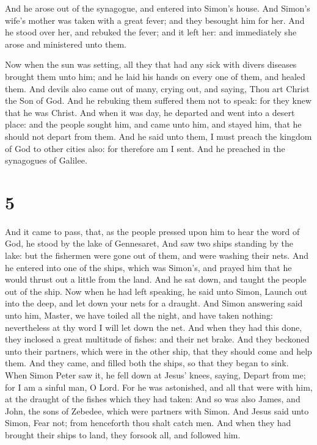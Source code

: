  And he arose out of the synagogue, and entered into
Simon's house. And Simon's wife's mother was taken with a great fever;
and they besought him for her.  And he stood over her,
and rebuked the fever; and it left her: and immediately she arose and
ministered unto them.

 Now when the sun was setting, all they that had any sick
with divers diseases brought them unto him; and he laid his hands on
every one of them, and healed them.  And devils also came
out of many, crying out, and saying, Thou art Christ the Son of God. And
he rebuking them suffered them not to speak: for they knew that he was
Christ.  And when it was day, he departed and went into a
desert place: and the people sought him, and came unto him, and stayed
him, that he should not depart from them.  And he said
unto them, I must preach the kingdom of God to other cities also: for
therefore am I sent.  And he preached in the synagogues
of Galilee.

\hypertarget{section-4}{%
\section{5}\label{section-4}}

 And it came to pass, that, as the people pressed upon him
to hear the word of God, he stood by the lake of Gennesaret,
 And saw two ships standing by the lake: but the fishermen
were gone out of them, and were washing their nets.  And
he entered into one of the ships, which was Simon's, and prayed him that
he would thrust out a little from the land. And he sat down, and taught
the people out of the ship.  Now when he had left
speaking, he said unto Simon, Launch out into the deep, and let down
your nets for a draught.  And Simon answering said unto
him, Master, we have toiled all the night, and have taken nothing:
nevertheless at thy word I will let down the net.  And
when they had this done, they inclosed a great multitude of fishes: and
their net brake.  And they beckoned unto their partners,
which were in the other ship, that they should come and help them. And
they came, and filled both the ships, so that they began to sink.
 When Simon Peter saw it, he fell down at Jesus' knees,
saying, Depart from me; for I am a sinful man, O Lord. 
For he was astonished, and all that were with him, at the draught of the
fishes which they had taken:  And so was also James, and
John, the sons of Zebedee, which were partners with Simon. And Jesus
said unto Simon, Fear not; from henceforth thou shalt catch men.
 And when they had brought their ships to land, they
forsook all, and followed him.

